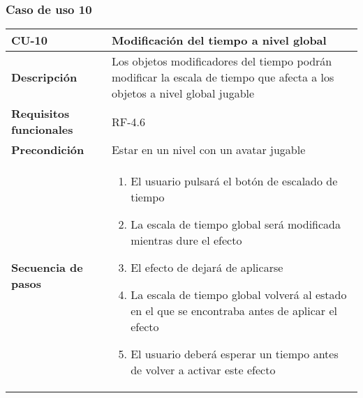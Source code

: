 \subsubsection{Caso de uso 10}
\begin{longtable}{l|l}
\begin{minipage}{0.25\columnwidth}
\textbf{CU-10} 
\end{minipage}
&
\begin{minipage}{0.65\columnwidth}
Modificación del tiempo a nivel global
\end{minipage}
\\ \hline

\begin{minipage}{0.25\columnwidth}
\textbf{Descripción} 
\end{minipage}
&
\begin{minipage}{0.65\columnwidth}
Los objetos modificadores del tiempo podrán modificar la escala de tiempo que afecta a los objetos a nivel global jugable
\end{minipage}
\\ \hline

\begin{minipage}{0.25\columnwidth}
\textbf{Requisitos funcionales} 
\end{minipage}
&
\begin{minipage}{0.65\columnwidth}
RF-4.6
\end{minipage}
\\ \hline

\begin{minipage}{0.25\columnwidth}
\textbf{Precondición} 
\end{minipage}
&
\begin{minipage}{0.65\columnwidth}
Estar en un nivel con un avatar jugable
\end{minipage}
\\ \hline

\begin{minipage}{0.25\columnwidth}
\textbf{Secuencia de pasos} 
\end{minipage}
&
\begin{minipage}{0.65\columnwidth}
\begin{enumerate}
\item
El usuario pulsará el botón de escalado de tiempo
\item
La escala de tiempo global será modificada mientras dure el efecto
\item
El efecto de dejará de aplicarse
\item
La escala de tiempo global volverá al estado en el que se encontraba antes de aplicar el efecto
\item
El usuario deberá esperar un tiempo antes de volver a activar este efecto
\end{enumerate}
\end{minipage}
\\ \hline


\end{longtable}
